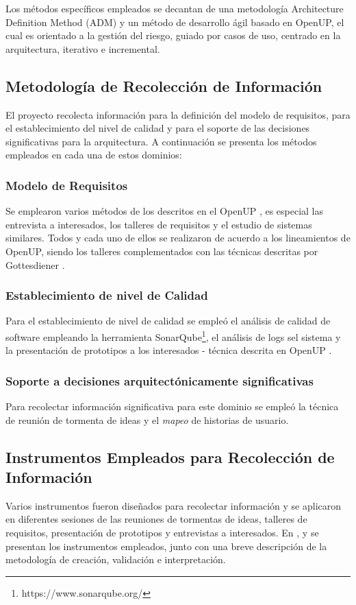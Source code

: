 Los métodos específicos empleados se decantan de una metodología Architecture Definition Method (ADM) y un método de desarrollo ágil basado en OpenUP, el cual es orientado a la  gestión del riesgo, guiado por casos de uso, centrado en la arquitectura, iterativo e incremental.

\subsection{Metodología de Recolección de Información}

El proyecto recolecta información para la definición del modelo de requisitos, para el establecimiento del nivel de calidad y para el soporte de las decisiones significativas para la arquitectura. A continuación se presenta los métodos empleados en cada una de estos dominios:

\subsubsection{Modelo de Requisitos}
Se emplearon varios métodos de los descritos en el OpenUP \cite{eclipse,2012}, es especial las entrevista a interesados, los talleres de requisitos y el estudio de sistemas similares. Todos y cada uno de ellos se realizaron de acuerdo a los lineamientos de OpenUP, siendo los talleres complementados con las técnicas descritas por Gottesdiener \cite{gottesdiener2012}.

\subsubsection{Establecimiento de nivel de Calidad}
Para el establecimiento de nivel de calidad se empleó el análisis de calidad de software empleando la herramienta SonarQube\footnote{https://www.sonarqube.org/}, el análisis de logs sel sistema y la presentación de prototipos a los interesados - técnica descrita en OpenUP \cite{eclipse,2012}. 

\subsubsection{Soporte a decisiones arquitectónicamente significativas}
Para recolectar información significativa para este dominio se empleó la técnica de reunión de tormenta de ideas y el \textit{mapeo} de historias de usuario\cite{patton2014}. 

\subsection{Instrumentos Empleados para Recolección de Información}
Varios instrumentos fueron diseñados para recolectar información y se aplicaron en diferentes sesiones de las reuniones de tormentas de ideas, talleres de requisitos, presentación de prototipos y entrevistas a interesados. En \label{appendix:entrevista_posible_interesado}, \label{formulario_preliminar} y \label{presentacion_prototipos} se presentan los instrumentos empleados, junto con una breve descripción de la metodología de creación, validación e interpretación.

